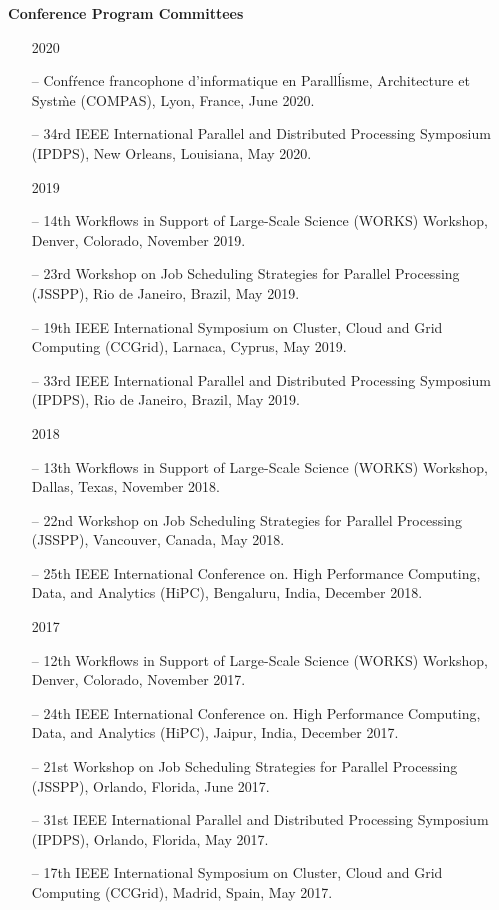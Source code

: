 \documentclass[times,11pt]{letter}
\begin{document}
\noindent
{\bf Conference Program Committees}
\begin{itemize}
\item [2020]
\item [--] Conf\'rence francophone d'informatique en Parall\'lisme, Architecture et Syst\`me (COMPAS), Lyon, France, June 2020.
\item [--] 34rd IEEE International Parallel and Distributed Processing Symposium (IPDPS), New Orleans, Louisiana, May 2020.
\item [2019]
\item[--]  14th Workflows in Support of Large-Scale Science (WORKS) Workshop, Denver, Colorado, November 2019.
\item[--]  23rd Workshop on Job Scheduling Strategies for Parallel Processing (JSSPP), Rio de Janeiro, Brazil, May 2019.
\item[--]  19th IEEE International Symposium on Cluster, Cloud and Grid Computing (CCGrid), Larnaca, Cyprus, May 2019.
\item[--]  33rd IEEE International Parallel and Distributed Processing Symposium (IPDPS), Rio de Janeiro, Brazil, May 2019.

\item [2018]
\item[--]  13th Workflows in Support of Large-Scale Science (WORKS) Workshop, Dallas, Texas, November 2018.
\item[--]  22nd Workshop on Job Scheduling Strategies for Parallel Processing (JSSPP), Vancouver, Canada, May 2018.
\item[--]  25th IEEE International Conference on. High Performance Computing, Data, and Analytics (HiPC), Bengaluru, India, December 2018.

\item [2017]
\item[--]  12th Workflows in Support of Large-Scale Science (WORKS) Workshop, Denver, Colorado, November 2017.
\item[--]  24th IEEE International Conference on. High Performance Computing, Data, and Analytics (HiPC), Jaipur, India, December 2017.
\item[--]  21st Workshop on Job Scheduling Strategies for Parallel Processing (JSSPP), Orlando, Florida, June 2017.
\item[--]  31st IEEE International Parallel and Distributed Processing Symposium (IPDPS), Orlando, Florida, May 2017.
\item[--]  17th IEEE International Symposium on Cluster, Cloud and Grid Computing (CCGrid), Madrid, Spain, May 2017.


\end{itemize}
\end{document}
